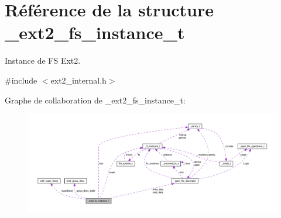 \hypertarget{struct__ext2__fs__instance__t}{\section{\-Référence de la structure \-\_\-ext2\-\_\-fs\-\_\-instance\-\_\-t}
\label{struct__ext2__fs__instance__t}
}


\-Instance de \-F\-S \-Ext2.  




{\ttfamily \#include $<$ext2\-\_\-internal.\-h$>$}



\-Graphe de collaboration de \-\_\-ext2\-\_\-fs\-\_\-instance\-\_\-t\-:\nopagebreak
\begin{figure}[H]
\begin{center}
\leavevmode
\includegraphics[width=350pt]{struct__ext2__fs__instance__t__coll__graph}
\end{center}
\end{figure}
